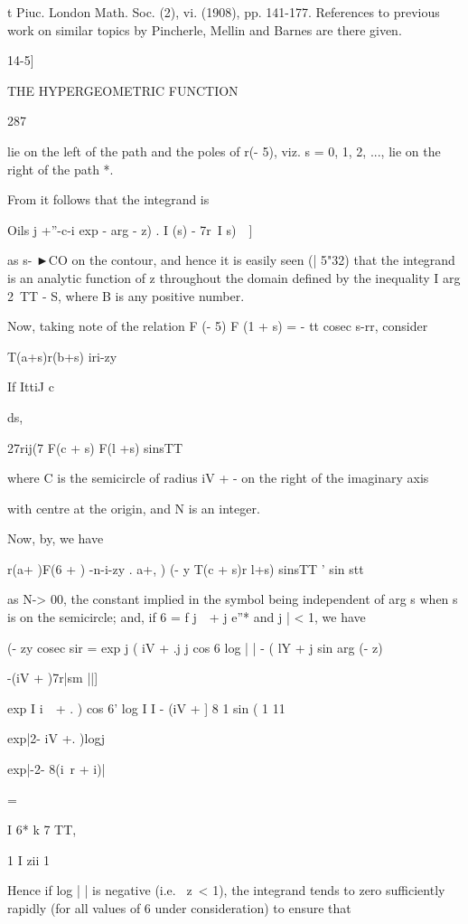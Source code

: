 t Piuc. London Math. Soc. (2), vi. (1908), pp. 141-177. References to
previous work on similar topics by Pincherle, Mellin and Barnes are
there given.

14-5]

THE HYPERGEOMETRIC FUNCTION

287

lie on the left of the path and the poles of r(- 5), viz. s = 0, 1, 2,
..., lie on the right of the path *.

From it follows that the integrand is

Oils j +''-c-i exp - arg - z) . I (s) - 7r\ I s)\ \ ]

as s- ►CO on the contour, and hence it is easily seen (| 5"32) that
the integrand is an analytic function of z throughout the domain
defined by the inequality I arg 2\ TT - S, where B is any positive
number.

Now, taking note of the relation F (- 5) F (1 + s) = - tt cosec s-rr,
consider

T(a+s)r(b+s) iri-zy

If IttiJ c

ds,

27rij(7 F(c + s) F(l +s) sinsTT

where C is the semicircle of radius iV + - on the right of the
imaginary axis

with centre at the origin, and N is an integer.

Now, by, we have

r(a+ )F(6 + ) -n-i-zy . a+,\,\,) (- y T(c + s)r l+s) sinsTT ' sin
stt

as N-> 00, the constant implied in the symbol being independent of
arg s when s is on the semicircle; and, if 6 = f j\ \ + j e''* and j
| < 1, we have

(- zy cosec sir = exp j ( iV + .j j cos 6 log | | - ( lY + j sin arg
(- z)

-(iV + )7r|sm ||]

exp I i\ \ + . ) cos 6' log I I - (iV + ] 8 1 sin ( 1 11

exp|2- iV +. )logj

exp|-2- 8(i\ r + i)|

=

  I 6* k 7 TT,

1 I zii 1

Hence if log | | is negative (i.e. \ z\ < 1), the integrand tends to
zero sufficiently rapidly (for all values of 6 under consideration) to
ensure that

